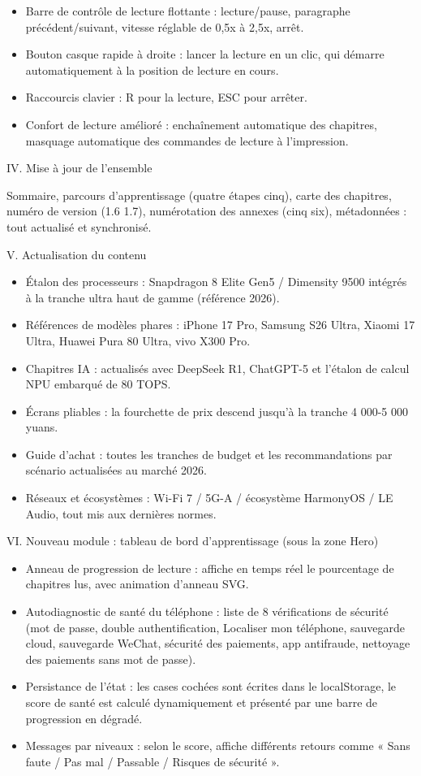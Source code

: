 \begin{itemize}
  \item Barre de contrôle de lecture flottante : lecture/pause, paragraphe précédent/suivant, vitesse réglable de 0,5x à 2,5x, arrêt.
  \item Bouton casque rapide à droite : lancer la lecture en un clic, qui démarre automatiquement à la position de lecture en cours.
  \item Raccourcis clavier : R pour la lecture, ESC pour arrêter.
  \item Confort de lecture amélioré : enchaînement automatique des chapitres, masquage automatique des commandes de lecture à l'impression.
\end{itemize}

IV. Mise à jour de l'ensemble

Sommaire, parcours d'apprentissage (quatre étapes cinq), carte des chapitres, numéro de version (1.6 1.7), numérotation des annexes (cinq six), métadonnées : tout actualisé et synchronisé.

V. Actualisation du contenu

\begin{itemize}
  \item Étalon des processeurs : Snapdragon 8 Elite Gen5 / Dimensity 9500 intégrés à la tranche ultra haut de gamme (référence 2026).
  \item Références de modèles phares : iPhone 17 Pro, Samsung S26 Ultra, Xiaomi 17 Ultra, Huawei Pura 80 Ultra, vivo X300 Pro.
  \item Chapitres IA : actualisés avec DeepSeek R1, ChatGPT-5 et l'étalon de calcul NPU embarqué de 80 TOPS.
  \item Écrans pliables : la fourchette de prix descend jusqu'à la tranche 4 000-5 000 yuans.
  \item Guide d'achat : toutes les tranches de budget et les recommandations par scénario actualisées au marché 2026.
  \item Réseaux et écosystèmes : Wi-Fi 7 / 5G-A / écosystème HarmonyOS / LE Audio, tout mis aux dernières normes.
\end{itemize}

VI. Nouveau module : tableau de bord d'apprentissage (sous la zone Hero)

\begin{itemize}
  \item Anneau de progression de lecture : affiche en temps réel le pourcentage de chapitres lus, avec animation d'anneau SVG.
  \item Autodiagnostic de santé du téléphone : liste de 8 vérifications de sécurité (mot de passe, double authentification, Localiser mon téléphone, sauvegarde cloud, sauvegarde WeChat, sécurité des paiements, app antifraude, nettoyage des paiements sans mot de passe).
  \item Persistance de l'état : les cases cochées sont écrites dans le localStorage, le score de santé est calculé dynamiquement et présenté par une barre de progression en dégradé.
  \item Messages par niveaux : selon le score, affiche différents retours comme « Sans faute / Pas mal / Passable / Risques de sécurité ».
\end{itemize}

